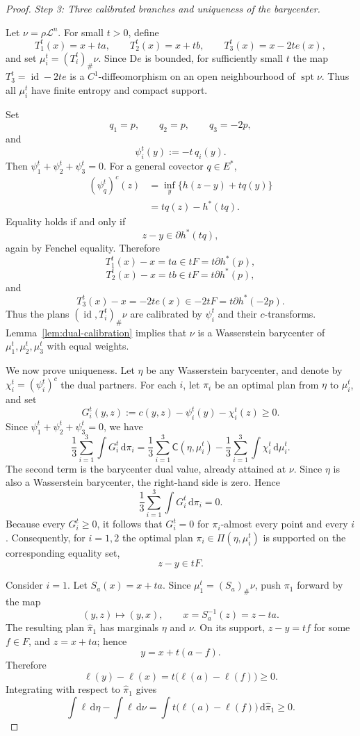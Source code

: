 \documentclass[a4paper,11pt]{article}
\numberwithin{equation}{section}
\newcommand{\id}{\operatorname{id}}
\newcommand{\supp}{\operatorname{spt}}
\newcommand{\dd}{\mathrm d}
\newcommand{\D}{\mathrm D}
\newcommand{\cL}{\mathcal L}
\begin{document}
\begin{proof}
		\medskip
		\noindent\emph{Step 3: Three calibrated branches and uniqueness of the barycenter.}
		
		Let $\nu=\rho\cL^n$. For small $t>0$, define
		\[
		T_1^t(x)=x+ta,
		\qquad T_2^t(x)=x+tb,
		\qquad T_3^t(x)=x-2t e(x),
		\]
		and set $\mu_i^t=(T_i^t)_\#\nu$. Since \(\D e\) is bounded, for sufficiently small \(t\) the map \(T_3^t=\id-2t e\) is a \(C^1\)-diffeomorphism on an open neighbourhood of \(\supp\nu\). Thus all $\mu_i^t$ have finite entropy and compact support.
		
		Set
		\[
		q_1=p,
		\qquad q_2=p,
		\qquad q_3=-2p,
		\]
		and
		\[
		\psi_i^t(y):=-t\,q_i(y).
		\]
		Then $\psi_1^t+\psi_2^t+\psi_3^t=0$. For a general covector $q\in E^*$,
		\[
		\begin{aligned}
			(\psi_q^t)^c(z)
			&=\inf_y\{h(z-y)+tq(y)\} \\
			&=tq(z)-h^*(tq).
		\end{aligned}
		\]
		Equality holds if and only if
		\[
		z-y\in\partial h^*(tq),
		\]
		again by Fenchel equality. Therefore
		\[
		T_1^t(x)-x=ta\in tF=t\partial h^*(p),
		\]
		\[
		T_2^t(x)-x=tb\in tF=t\partial h^*(p),
		\]
		and
		\[
		T_3^t(x)-x=-2t e(x)\in -2tF=t\partial h^*(-2p).
		\]
		Thus the plans $(\id,T_i^t)_\#\nu$ are calibrated by $\psi_i^t$ and their $c$-transforms. Lemma~\ref{lem:dual-calibration} implies that $\nu$ is a Wasserstein barycenter of $\mu_1^t,\mu_2^t,\mu_3^t$ with equal weights.
		
		We now prove uniqueness. Let $\eta$ be any Wasserstein barycenter, and denote by $\chi_i^t=(\psi_i^t)^c$ the dual partners. For each \(i\), let \(\pi_i\) be an optimal plan from \(\eta\) to \(\mu_i^t\), and set
		\[
		G_i^t(y,z):=c(y,z)-\psi_i^t(y)-\chi_i^t(z)\ge0.
		\]
		Since \(\psi_1^t+\psi_2^t+\psi_3^t=0\), we have
		\[
		\frac13\sum_{i=1}^3\int G_i^t\,\dd\pi_i
		=
		\frac13\sum_{i=1}^3 \mathsf C(\eta,\mu_i^t)
		-
		\frac13\sum_{i=1}^3\int \chi_i^t\,\dd\mu_i^t.
		\]
		The second term is the barycenter dual value, already attained at \(\nu\). Since
		\(\eta\) is also a Wasserstein barycenter, the right-hand side is zero. Hence
		\[
		\frac13\sum_{i=1}^3\int G_i^t\,\dd\pi_i=0.
		\]
		Because every \(G_i^t\ge0\), it follows that
		\(G_i^t=0\) for \(\pi_i\)-almost every point and every \(i\). Consequently, for $i=1,2$ the optimal plan $\pi_i\in\Pi(\eta,\mu_i^t)$ is supported on the corresponding equality set,
		\[
		z-y\in tF.
		\]
		
		Consider $i=1$. Let $S_a(x)=x+ta$. Since $\mu_1^t=(S_a)_\#\nu$, push $\pi_1$ forward by the map
		\[
		(y,z)\longmapsto (y,x),\qquad x=S_a^{-1}(z)=z-ta.
		\]
		The resulting plan $\widehat\pi_1$ has marginals $\eta$ and $\nu$. On its support, $z-y=tf$ for some $f\in F$, and $z=x+ta$; hence
		\[
		y=x+t(a-f).
		\]
		Therefore
		\[
		\ell(y)-\ell(x)=t\bigl(\ell(a)-\ell(f)\bigr)\ge0.
		\]
		Integrating with respect to $\widehat\pi_1$ gives
		\begin{equation}\label{eq:anchor-a-ineq}
			\int \ell\,\dd\eta-\int \ell\,\dd\nu
			=\int t\bigl(\ell(a)-\ell(f)\bigr)\,\dd\widehat\pi_1\ge0.
		\end{equation}
		

\end{proof}
\end{document}
